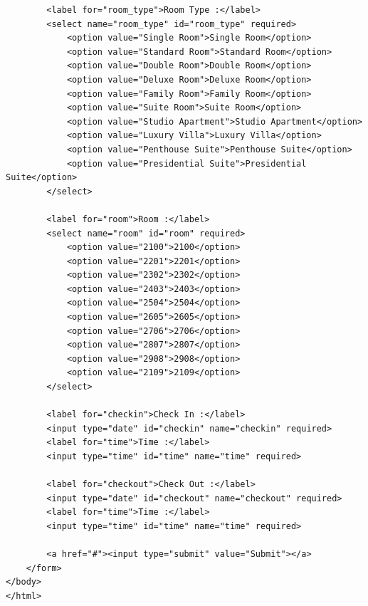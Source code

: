 \documentclass{report}
\begin{document}
\begin{verbatim}
        <label for="room_type">Room Type :</label>
        <select name="room_type" id="room_type" required>
            <option value="Single Room">Single Room</option>
            <option value="Standard Room">Standard Room</option>
            <option value="Double Room">Double Room</option>
            <option value="Deluxe Room">Deluxe Room</option>
            <option value="Family Room">Family Room</option>
            <option value="Suite Room">Suite Room</option>
            <option value="Studio Apartment">Studio Apartment</option>
            <option value="Luxury Villa">Luxury Villa</option>
            <option value="Penthouse Suite">Penthouse Suite</option>
            <option value="Presidential Suite">Presidential Suite</option>
        </select>

        <label for="room">Room :</label>
        <select name="room" id="room" required>
            <option value="2100">2100</option>
            <option value="2201">2201</option>
            <option value="2302">2302</option>
            <option value="2403">2403</option>
            <option value="2504">2504</option>
            <option value="2605">2605</option>
            <option value="2706">2706</option>
            <option value="2807">2807</option>
            <option value="2908">2908</option>
            <option value="2109">2109</option>
        </select>

        <label for="checkin">Check In :</label>
        <input type="date" id="checkin" name="checkin" required>
        <label for="time">Time :</label>
        <input type="time" id="time" name="time" required>

        <label for="checkout">Check Out :</label>
        <input type="date" id="checkout" name="checkout" required>
        <label for="time">Time :</label>
        <input type="time" id="time" name="time" required>
        
        <a href="#"><input type="submit" value="Submit"></a>
    </form>
</body>
</html>

\end{verbatim}
\end{document}
